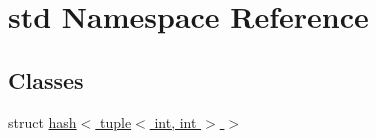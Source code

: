 \hypertarget{namespacestd}{}\section{std Namespace Reference}
\label{namespacestd}
\subsection*{Classes}
\begin{DoxyCompactItemize}
\item 
struct \hyperlink{structstd_1_1hash_3_01tuple_3_01int_00_01int_01_4_01_4}{hash$<$ tuple$<$ int, int $>$ $>$}
\end{DoxyCompactItemize}
